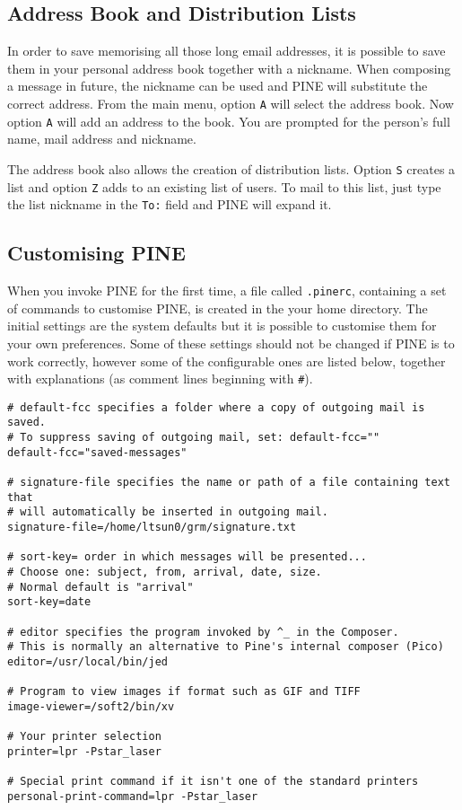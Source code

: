 \subsection{Address Book and Distribution Lists}

In order to save memorising all those long email addresses, it is
possible to save them in your personal address book together with a
nickname.  When composing a message in future, the nickname can be used
and PINE will substitute the correct address. From the main menu,
option {\tt A} will select the address book. Now option {\tt A} will
add an address to the book. You are prompted for the person's full
name, mail address and nickname.

The address book also allows the creation of distribution lists.
Option {\tt S} creates a list and option {\tt Z} adds to an existing
list of users. To mail to this list, just type the list nickname in the
{\tt To:} field and PINE will expand it.

\subsection{Customising PINE}
\label{sec-cust}

When you invoke PINE for the first time, a file called {\tt .pinerc},
containing a set of commands to customise PINE, is created in the your
home directory. The initial settings are the system defaults but it is
possible to customise them for your own preferences.  Some of these
settings should not be changed if PINE is to work correctly, however
some of the configurable ones are listed below, together with
explanations (as comment lines beginning with {\tt \#}).

\begin{small}
\begin{verbatim}
# default-fcc specifies a folder where a copy of outgoing mail is saved.
# To suppress saving of outgoing mail, set: default-fcc=""
default-fcc="saved-messages"

# signature-file specifies the name or path of a file containing text that
# will automatically be inserted in outgoing mail.
signature-file=/home/ltsun0/grm/signature.txt

# sort-key= order in which messages will be presented...
# Choose one: subject, from, arrival, date, size.
# Normal default is "arrival"
sort-key=date

# editor specifies the program invoked by ^_ in the Composer.
# This is normally an alternative to Pine's internal composer (Pico)
editor=/usr/local/bin/jed

# Program to view images if format such as GIF and TIFF
image-viewer=/soft2/bin/xv

# Your printer selection
printer=lpr -Pstar_laser

# Special print command if it isn't one of the standard printers
personal-print-command=lpr -Pstar_laser
\end{verbatim}
\end{small}

